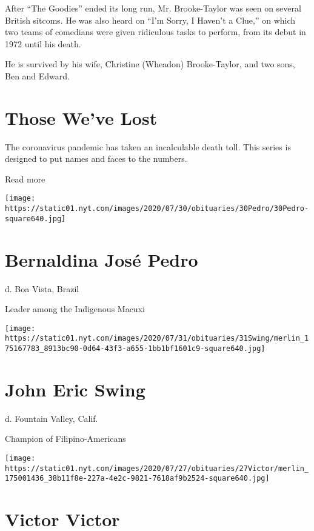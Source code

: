 After ``The Goodies'' ended its long run, Mr. Brooke-Taylor was seen on
several British sitcoms. He was also heard on ``I'm Sorry, I Haven't a
Clue,'' on which two teams of comedians were given ridiculous tasks to
perform, from its debut in 1972 until his death.

He is survived by his wife, Christine (Wheadon) Brooke-Taylor, and two
sons, Ben and Edward.

\href{https://www.nytimes.com/interactive/2020/obituaries/people-died-coronavirus-obituaries.html?action=click\&pgtype=Article\&state=default\&region=BELOW_MAIN_CONTENT\&context=covid_obits_promo}{}

\hypertarget{those-weve-lost}{%
\section{Those We've Lost}\label{those-weve-lost}}

The coronavirus pandemic has taken an incalculable death toll. This
series is designed to put names and faces to the numbers.

Read more

\texttt{[image: https://static01.nyt.com/images/2020/07/30/obituaries/30Pedro/30Pedro-square640.jpg]}

\hypertarget{bernaldina-josuxe9-pedro}{%
\section{Bernaldina José Pedro}\label{bernaldina-josuxe9-pedro}}

d. Boa Vista, Brazil

Leader among the Indigenous Macuxi

\texttt{[image: https://static01.nyt.com/images/2020/07/31/obituaries/31Swing/merlin\_175167783\_8913bc90-0d64-43f3-a655-1bb1bf1601c9-square640.jpg]}

\hypertarget{john-eric-swing}{%
\section{John Eric Swing}\label{john-eric-swing}}

d. Fountain Valley, Calif.

Champion of Filipino-Americans

\texttt{[image: https://static01.nyt.com/images/2020/07/27/obituaries/27Victor/merlin\_175001436\_38b11f8e-227a-4e2c-9821-7618af9b2524-square640.jpg]}

\hypertarget{victor-victor}{%
\section{Victor Victor}\label{victor-victor}}

